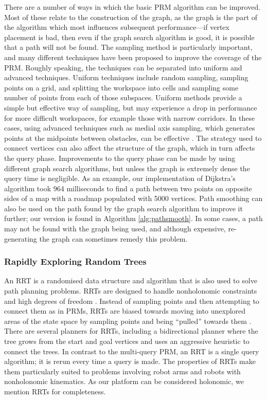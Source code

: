 \documentclass[conference]{IEEEtran}
\begin{document}
There are a number of ways in which the basic PRM algorithm can be improved. Most of these relate to the construction of the graph, as the graph is the part of the algorithm which most influences subsequent performance---if vertex placement is bad, then even if the graph search algorithm is good, it is possible that a path will not be found. The sampling method is particularly important, and many different techniques have been proposed to improve the coverage of the PRM. Roughly speaking, the techniques can be separated into uniform and advanced techniques. Uniform techniques include random sampling, sampling points on a grid, and splitting the workspace into cells and sampling some number of points from each of those subspaces. Uniform methods provide a simple but effective way of sampling, but may experience a drop in performance for more difficult workspaces, for example those with narrow corridors. In these cases, using advanced techniques such as medial axis sampling, which generates points at the midpoints between obstacles, can be effective \cite{sampling}. The strategy used to connect vertices can also affect the structure of the graph, which in turn affects the query phase. Improvements to the query phase can be made by using different graph search algorithms, but unless the graph is extremely dense the query time is negligible. As an example, our implementation of Dijkstra's algorithm took 964 milliseconds to find a path between two points on opposite sides of a map with a roadmap populated with 5000 vertices. Path smoothing can also be used on the path found by the graph search algorithm to improve it further; our version is found in Algorithm \ref{alg:pathsmooth}. In some cases, a path may not be found with the graph being used, and although expensive, re-generating the graph can sometimes remedy this problem.

\subsubsection{Rapidly Exploring Random Trees}
An RRT is a randomised data structure and algorithm that is also used to solve path planning problems. RRTs are designed to handle nonholonomic constraints and high degrees of freedom \cite{rrt}. Instead of sampling points and then attempting to connect them as in PRMs, RRTs are biased towards moving into unexplored areas of the state space by sampling points and being ``pulled'' towards them \cite{rrtprog}. There are several planners for RRTs, including a bidirectional planner where the tree grows from the start and goal vertices and uses an aggressive heuristic to connect the trees. In contrast to the multi-query PRM, an RRT is a single query algorithm; it is rerun every time a query is made. The properties of RRTs make them particularly suited to problems involving robot arms and robots with nonholonomic kinematics. As our platform can be considered holonomic, we mention RRTs for completeness.
\end{document}
